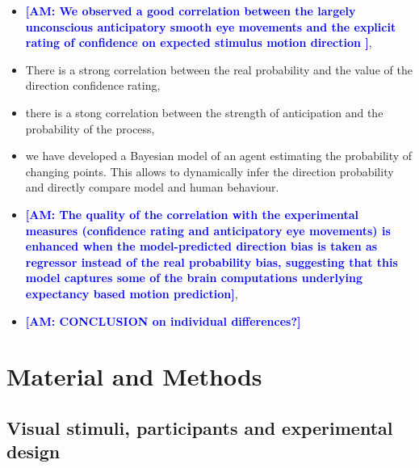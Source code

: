 \documentclass[12pt,english]{article}%
\newcommand{\AM}[1]{\textbf{\textcolor{blue}{[AM: #1]}}}
\begin{document}
\begin{itemize}\setlength{\itemsep}{0ex}
\item \AM{ We observed a good correlation between the largely unconscious anticipatory smooth eye movements and the explicit rating of confidence on expected stimulus motion direction },
\item There is a strong correlation between the real probability and the value of the direction confidence rating,

\item there is a stong correlation between the strength of anticipation and the probability of the process,

\item we have developed a Bayesian model of an agent estimating the probability of changing points. This allows to dynamically infer the direction probability and directly compare model and human behaviour.
\item \AM{ The quality of the correlation with the experimental measures (confidence rating and anticipatory eye movements) is enhanced when the model-predicted direction bias \hat{p} is taken as regressor instead of the real probability bias, suggesting that this model captures some of the brain computations underlying expectancy based motion prediction},
\item \AM{CONCLUSION on individual differences?}


%

\end{itemize}
\section{Material and Methods}
\subsection{Visual stimuli, participants and experimental design}
\end{document}
